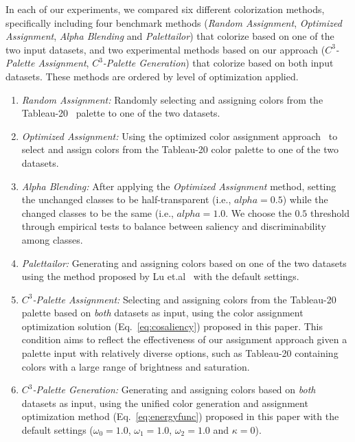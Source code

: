 \vspace{.3em}
 In each of our experiments, we compared six different colorization methods, specifically including four benchmark methods (\emph{Random Assignment}, \emph{Optimized Assignment}, \emph{Alpha Blending} and \emph{Palettailor}) that colorize based on one of the two input datasets, and two experimental methods based on our approach (\emph{$C^3$-Palette Assignment}, \emph{$C^3$-Palette Generation}) that colorize based on both input datasets. These methods are ordered by level of optimization applied.
\begin{enumerate}
     \item \emph{Random Assignment:} Randomly selecting and assigning colors from the Tableau-20~\cite{tableau} palette to one of the two datasets.
     \item \emph{Optimized Assignment:} Using the optimized color assignment approach~\cite{Wang2018} to select and assign colors from the Tableau-20 color palette to one of the two datasets.
     \item \emph{Alpha Blending:} After applying the \emph{Optimized Assignment} method, setting the unchanged classes to be half-transparent (i.e., $alpha=0.5$) while the changed classes to be the same (i.e., $alpha=1.0$. We choose the $0.5$ threshold through empirical tests to balance between saliency and discriminability among classes. %
     \item \emph{Palettailor:} Generating and assigning colors based on one of the two datasets using the method proposed by Lu et.al~\cite{Lu21} with the default settings.
     \item \emph{$C^3$-Palette Assignment:} Selecting and assigning colors from the Tableau-20 palette based on \emph{both} datasets as input, using the color assignment optimization solution (Eq.~\ref{eq:cosaliency}) proposed in this paper. This condition aims to reflect the effectiveness of our assignment approach given a palette input with relatively diverse options, such as Tableau-20 containing colors with a large range of brightness and saturation.
     \item \emph{$C^3$-Palette Generation:} Generating and assigning colors based on \emph{both} datasets as input, using the unified color generation and assignment optimization method (Eq.~\ref{eq:energyfunc}) proposed in this paper with the default settings ($\omega_0=1.0$, $\omega_1=1.0$, $\omega_2=1.0$ and $\kappa=0$).
\end{enumerate}


